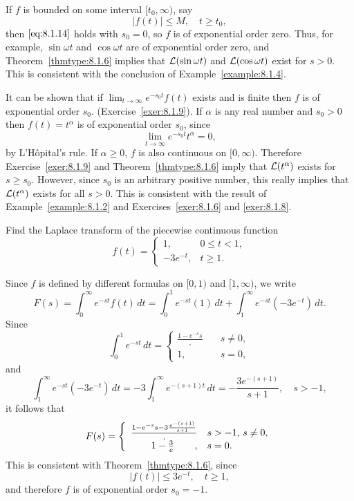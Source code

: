 \documentclass{ximera}
\begin{document}
\begin{example}\label{example:8.1.8}
If $f$ is bounded on some interval $[t_0,\infty)$, say
$$
|f(t)| \leq M,\quad t \geq t_0,
$$
then $\eqref{eq:8.1.14}$ holds with $s_0=0$, so $f$ is of exponential order
zero. Thus, for example, $\sin\omega t$ and $\cos \omega t$ are of
exponential order zero, and Theorem~\ref{thmtype:8.1.6} implies that
${\cal L}(\sin\omega t)$ and ${\cal L}(\cos \omega t)$ exist for
$s>0$. This is consistent with the conclusion of
Example~\ref{example:8.1.4}.
\end{example}

\begin{example}\label{example:8.1.9}
It can be shown that if $\lim_{t\rightarrow\infty}e^{-s_0t}f(t)$ exists and is
finite then $f$ is of exponential order $s_0$.
(Exercise~\ref{exer:8.1.9}). 
If $\alpha$ is any real number and $s_0>0$
then $f(t)=t^\alpha$ is of exponential order $s_0$, since
$$
\lim_{t\rightarrow\infty}e^{-s_0t}t^\alpha=0,
$$
by L'H\^opital's rule. If $\alpha\geq 0$, $f$ is also
continuous on $[0,\infty)$. Therefore Exercise~\ref{exer:8.1.9} and
Theorem~\ref{thmtype:8.1.6} imply that ${\cal L}(t^\alpha)$ exists for
$s\geq s_0$. However, since $s_0$ is an arbitrary positive number, this
really implies that ${\cal L}(t^\alpha)$ exists for all $s>0$. This is
consistent with the result of Example~\ref{example:8.1.2} and
Exercises~\ref{exer:8.1.6} and \ref{exer:8.1.8}.
\end{example}

\begin{example}\label{example:8.1.10}
Find the Laplace transform of the piecewise continuous function
$$
f(t)=\left\{\begin{array}{cl} 1,&0\leq t<1,\\  -3e^{-t},&t\geq
1.\end{array}\right.
$$
\begin{explanation}
Since $f$ is defined by different formulas
on $[0,1)$ and $[1,\infty)$, we write
$$
 F(s)=\int_0^\infty e^{-st} f(t)\,dt
=\int_0^1e^{-st}(1)\,dt+\int_1^\infty
e^{-st}(-3e^{-t})\,dt.
$$
Since
$$
\int_0^1e^{-st}\,dt=\left\{\begin{array}{cl}\frac{{1-e^{-s}}{s}},&\quad s\neq 0,\\ 1,&\quad s=0,\end{array}\right.
$$
 and
$$
\int_1^\infty e^{-st}(-3e^{-t})\,dt=-3\int_1^\infty
e^{-(s+1)t}\,dt=-\frac{3e^{-(s+1)}}{s+1},\quad s>-1,
$$
it follows that
$$
F(s)=\left\{\begin{array}{rl}\frac{{1-e^{-s}}{s}-3\frac{e^{-(s+1)}}{s+1}},&s>-1,\,s\neq 0,\\\hfill{1-\frac{3}{e}}\hfill,&
s=0.\end{array}\right.
$$
This is consistent with Theorem~\ref{thmtype:8.1.6}, since
$$
|f(t)|\leq 3e^{-t},\quad  t\geq 1,
$$
and therefore $f$ is of exponential order $s_0=-1$.
\end{explanation}
\end{example}
\end{document}
